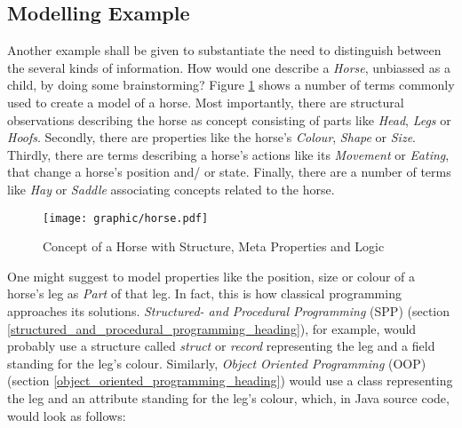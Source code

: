 %
%
%
%
%
%
%

\subsection{Modelling Example}
\label{modelling_example_heading}

Another example shall be given to substantiate the need to distinguish between
the several kinds of information. How would one describe a \emph{Horse},
unbiassed as a child, by doing some brainstorming? Figure \ref{horse_figure}
shows a number of terms commonly used to create a model of a horse. Most
importantly, there are structural observations describing the horse as concept
consisting of parts like \emph{Head}, \emph{Legs} or \emph{Hoofs}. Secondly,
there are properties like the horse's \emph{Colour}, \emph{Shape} or
\emph{Size}. Thirdly, there are terms describing a horse's actions like its
\emph{Movement} or \emph{Eating}, that change a horse's position and/ or state.
Finally, there are a number of terms like \emph{Hay} or \emph{Saddle}
associating concepts related to the horse.

\begin{figure}[ht]
    \begin{center}
        \texttt{[image: graphic/horse.pdf]}
        \caption{Concept of a Horse with Structure, Meta Properties and Logic}
        \label{horse_figure}
    \end{center}
\end{figure}

One might suggest to model properties like the position, size or colour of a
horse's leg as \emph{Part} of that leg. In fact, this is how classical
programming approaches its solutions.
\emph{Structured- and Procedural Programming} (SPP)
(section \ref{structured_and_procedural_programming_heading}), for example,
would probably use a structure called \emph{struct} or \emph{record}
representing the leg and a field standing for the leg's colour. Similarly,
\emph{Object Oriented Programming} (OOP)
(section \ref{object_oriented_programming_heading}) would use a class
representing the leg and an attribute standing for the leg's colour, which, in
Java source code, would look as follows:

